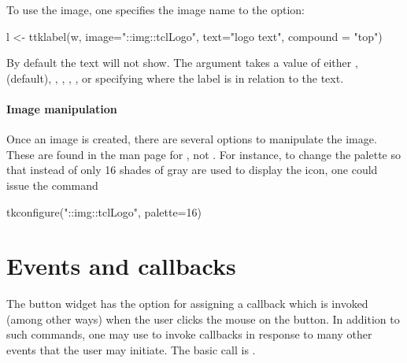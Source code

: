 To use the image, one specifies the image name to the
 option:
\begin{Schunk}
\begin{Sinput}
 l <- ttklabel(w, image="::img::tclLogo", text="logo text", 
               compound = "top")
\end{Sinput}
\end{Schunk}

By default the text will not show. The 
argument takes a value of either , 
(default), , , , ,
or  specifying where the label is in relation to the
text.

\paragraph{Image manipulation}
Once an image is created, there are several options to manipulate the
image. These are found in the \TK\/ man page for , not
. For instance, to change the palette so that instead of
 only 16 shades of gray are used to display the icon,
one could issue the command
\begin{Schunk}
\begin{Sinput}
 tkconfigure("::img::tclLogo", palette=16)
\end{Sinput}
\end{Schunk}




\section{Events and callbacks}
\label{sec:tcltk:overview:events-callbacks}

The button widget has the  option for assigning a
callback which is invoked (among other ways) when the user clicks the
mouse on the button. In addition to such commands, one may use
 to invoke callbacks in response to many other events
that the user may initiate. The basic call is . 


